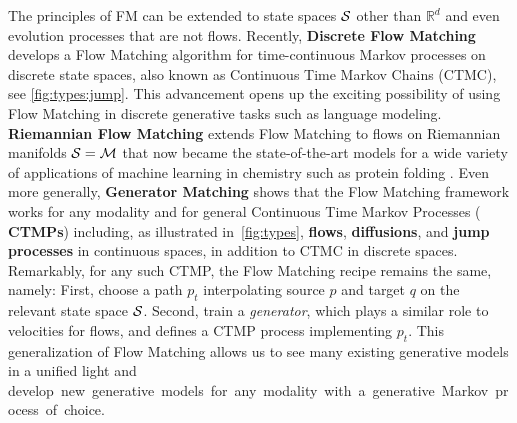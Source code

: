 \documentclass{fairmeta}
\newcommand{\highlight}[1]{{\color{metablue} \textbf{#1}}}
\numberwithin{equation}{section}
\begin{document}
The principles of FM can be extended to state spaces ${\mathcal{S}}$ other than $\mathbb{R}^d$ and even evolution processes that are not flows. Recently, \highlight{Discrete Flow Matching} \citep{campbell2024generative,gat2024discrete} develops a Flow Matching algorithm for time-continuous Markov processes on discrete state spaces, also known as Continuous Time Markov Chains (CTMC), see \cref{fig:types:jump}. This advancement opens up the exciting possibility of using Flow Matching in discrete generative tasks such as language modeling. \highlight{Riemannian Flow Matching} \citep{chen2024flow} extends Flow Matching to flows on Riemannian manifolds ${\mathcal{S}}={\mathcal{M}}$ that now became the state-of-the-art models for a wide variety of applications of machine learning in chemistry such as protein folding \citep{yim2023fast,bose2023se}.
Even more generally, \highlight{Generator Matching} \citep{holderrieth2024gm} shows that the Flow Matching framework works for any modality and for general Continuous Time Markov Processes (\highlight{CTMPs}) including, as illustrated in~\cref{fig:types}, \highlight{flows}, \highlight{diffusions}, and \highlight{jump processes} in continuous spaces, in addition to CTMC in discrete spaces.
Remarkably, for any such CTMP, the Flow Matching recipe remains the same, namely: First, choose a path $p_t$ interpolating source $p$ and target $q$ on the relevant state space ${\mathcal{S}}$. Second, train a \emph{generator}, which plays a similar role to velocities for flows, and defines a CTMP process implementing $p_t$. This generalization of Flow Matching allows us to see many existing generative models in a unified light and \hbox{develop new generative models for any modality with a generative Markov process of choice.} 
\end{document}
